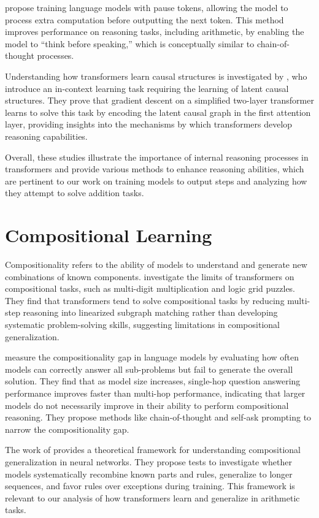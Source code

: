 \cite{goyal_think_2024} propose training language models with pause tokens, allowing the model to process extra computation before outputting the next token. This method improves performance on reasoning tasks, including arithmetic, by enabling the model to ``think before speaking,'' which is conceptually similar to chain-of-thought processes.

Understanding how transformers learn causal structures is investigated by \cite{nichani_how_2024}, who introduce an in-context learning task requiring the learning of latent causal structures. They prove that gradient descent on a simplified two-layer transformer learns to solve this task by encoding the latent causal graph in the first attention layer, providing insights into the mechanisms by which transformers develop reasoning capabilities.

Overall, these studies illustrate the importance of internal reasoning processes in transformers and provide various methods to enhance reasoning abilities, which are pertinent to our work on training models to output steps and analyzing how they attempt to solve addition tasks.

\section{Compositional Learning}\label{sota_compositional_learning}

Compositionality refers to the ability of models to understand and generate new combinations of known components. \cite{dziri_faith_2023} investigate the limits of transformers on compositional tasks, such as multi-digit multiplication and logic grid puzzles. They find that transformers tend to solve compositional tasks by reducing multi-step reasoning into linearized subgraph matching rather than developing systematic problem-solving skills, suggesting limitations in compositional generalization.

\cite{press_measuring_2023} measure the compositionality gap in language models by evaluating how often models can correctly answer all sub-problems but fail to generate the overall solution. They find that as model size increases, single-hop question answering performance improves faster than multi-hop performance, indicating that larger models do not necessarily improve in their ability to perform compositional reasoning. They propose methods like chain-of-thought and self-ask prompting to narrow the compositionality gap.

The work of \cite{hupkes_compositionality_2020} provides a theoretical framework for understanding compositional generalization in neural networks. They propose tests to investigate whether models systematically recombine known parts and rules, generalize to longer sequences, and favor rules over exceptions during training. This framework is relevant to our analysis of how transformers learn and generalize in arithmetic tasks.

